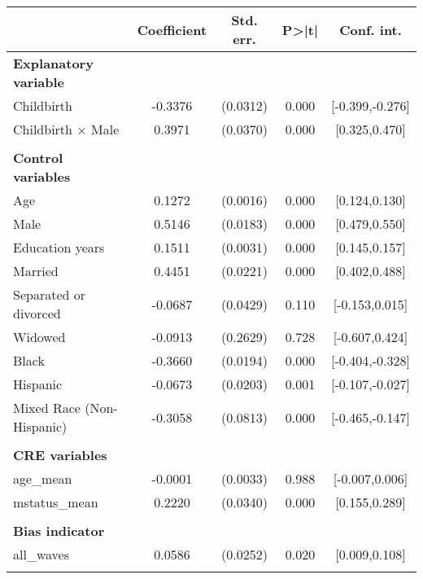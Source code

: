 {
\def\sym#1{\ifmmode^{#1}\else\(^{#1}\)\fi}
\begin{tabular}{l*{1}{cccc}}
\toprule
                    & Coefficient&   Std. err.&       P>|t|&  Conf. int.\\
\midrule
\textbf{Explanatory variable}&            &            &            &            \\
Childbirth          &     -0.3376&    (0.0312)&       0.000&[-0.399,-0.276]\\
Childbirth $\times$ Male&      0.3971&    (0.0370)&       0.000&[0.325,0.470]\\
\\ \textbf{Control variables}&            &            &            &            \\
Age                 &      0.1272&    (0.0016)&       0.000&[0.124,0.130]\\
Male                &      0.5146&    (0.0183)&       0.000&[0.479,0.550]\\
Education years     &      0.1511&    (0.0031)&       0.000&[0.145,0.157]\\
Married             &      0.4451&    (0.0221)&       0.000&[0.402,0.488]\\
Separated or divorced&     -0.0687&    (0.0429)&       0.110&[-0.153,0.015]\\
Widowed             &     -0.0913&    (0.2629)&       0.728&[-0.607,0.424]\\
Black               &     -0.3660&    (0.0194)&       0.000&[-0.404,-0.328]\\
Hispanic            &     -0.0673&    (0.0203)&       0.001&[-0.107,-0.027]\\
Mixed Race (Non-Hispanic)&     -0.3058&    (0.0813)&       0.000&[-0.465,-0.147]\\
\\ \textbf{CRE variables}&            &            &            &            \\
age\_mean            &     -0.0001&    (0.0033)&       0.988&[-0.007,0.006]\\
mstatus\_mean        &      0.2220&    (0.0340)&       0.000&[0.155,0.289]\\
\\ \textbf{Bias indicator}&            &            &            &            \\
all\_waves           &      0.0586&    (0.0252)&       0.020&[0.009,0.108]\\
                    &            &            &            &            \\

\end{tabular}}
